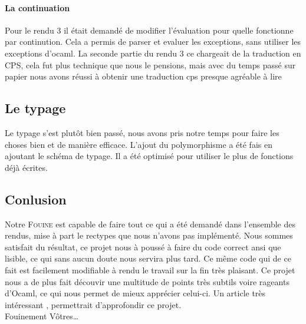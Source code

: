 \documentclass[14pt,a4paper]{extarticle}
\newcommand{\fouine}{\textsc{Fouine }}
\begin{document}
\paragraph{La continuation}
Pour le rendu 3 il était demandé de modifier l'évaluation pour
quelle fonctionne par continution. Cela a permis de parser et
evaluer les exceptions, sans utiliser les exceptions d'ocaml.
La seconde partie du rendu 3 ce chargeait de la traduction en
CPS, cela fut plus technique que nous le pensions, mais avec
du temps passé sur papier nous avons réussi à obtenir une traduction
cps presque agréable à lire \cite{HIRSCHKOFF}

\subsection{Le typage}
Le typage s'est plutôt bien passé, nous avons pris notre temps
pour faire les choses bien et de manière efficace. L'ajout du polymorphisme
a été fais en ajoutant le schéma de typage. Il a été optimisé pour utiliser
le plus de fonctions déjà écrites.

\subsection{Conlusion}
Notre \fouine est capable de faire tout ce qui a été demandé
dans l'ensemble des rendus, mise à part le rectypes que nous
n'avons pas implémenté. Nous sommes satisfait du résultat, ce
projet nous à poussé à faire du code correct ansi que lisible, ce
qui sans aucun doute nous servira plus tard. Ce même code qui de
ce fait est facilement modifiable à rendu le travail sur la fin
très plaisant. Ce projet nous a de plus fait découvir une multitude
de points très subtils voire rageants  d'Ocaml, ce qui nous permet de mieux apprécier
celui-ci. Un article très intéressant \cite{DBLP:journals/cacm/Landin66},
permettrait d'approfondir ce projet.\\[2cm]

Fouinement Vôtres\ldots



\end{document}
